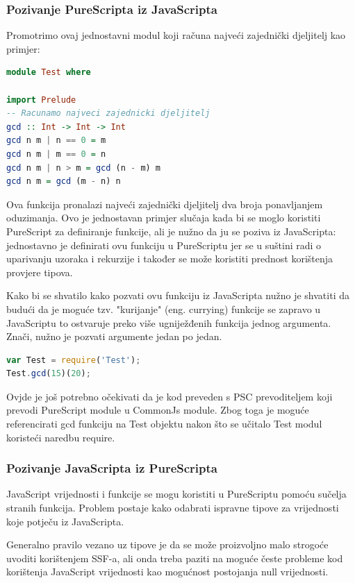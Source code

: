 \documentclass[times, utf8, zavrsni]{fer}
\begin{document}
\subsubsection{Pozivanje PureScripta iz JavaScripta}
Promotrimo ovaj jednostavni modul koji računa najveći zajednički djeljitelj kao primjer:

\begin{lstlisting}[language=PureScript, basicstyle=\small\linespread{0.8}]
module Test where

import Prelude
-- Racunamo najveci zajednicki djeljitelj
gcd :: Int -> Int -> Int
gcd n m | n == 0 = m
gcd n m | m == 0 = n
gcd n m | n > m = gcd (n - m) m
gcd n m = gcd (m - n) n
\end{lstlisting}

Ova funkcija pronalazi najveći zajednički djeljitelj dva broja ponavljanjem oduzimanja. Ovo je jednostavan primjer slučaja kada bi se moglo koristiti PureScript za definiranje funkcije, ali je nužno da ju se poziva iz JavaScripta: jednostavno je definirati ovu funkciju u PureScriptu jer se u suštini radi o uparivanju uzoraka i rekurzije i također se može koristiti prednost korištenja provjere tipova.

Kako bi se shvatilo kako pozvati ovu funkciju iz JavaScripta nužno je shvatiti da budući da je moguće tzv. "kurijanje" (eng. currying) funkcije se zapravo u JavaScriptu to ostvaruje preko više ugniježđenih funkcija jednog argumenta. Znači, nužno je pozvati argumente jedan po jedan.

\begin{lstlisting}[language=JavaScript, basicstyle=\small\linespread{0.8}]
var Test = require('Test');
Test.gcd(15)(20);
\end{lstlisting}

Ovjde je još potrebno očekivati da je kod preveden s PSC prevoditeljem koji prevodi PureScript module u CommonJs module. Zbog toga je moguće referencirati gcd funkciju na Test objektu nakon što se učitalo Test modul koristeći naredbu require.

\subsubsection{Pozivanje JavaScripta iz PureScripta}
JavaScript vrijednosti i funkcije se mogu koristiti u PureScriptu pomoću sučelja stranih funkcija. Problem postaje kako odabrati ispravne tipove za vrijednosti koje potječu iz JavaScripta.

Generalno pravilo vezano uz tipove je da se može proizvoljno malo strogoće uvoditi korištenjem SSF-a, ali onda treba paziti na moguće česte probleme kod korištenja JavaScript vrijednosti kao mogućnost postojanja null vrijednosti.
\end{document}
